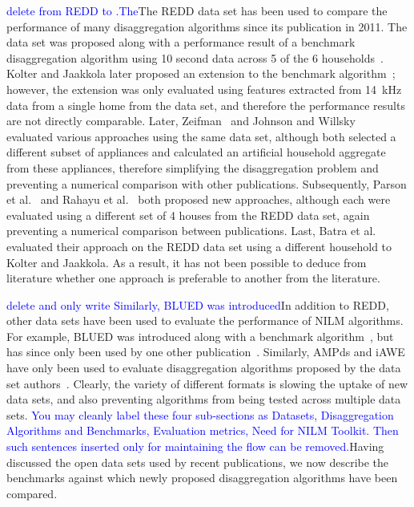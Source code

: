 \documentclass{sig-alternate}
\newcommand{\bluecolor}[1]{\textcolor{blue}{#1}}
\begin{document}
\bluecolor{delete from REDD to .The}The REDD data set has been used to compare the performance of many disaggregation algorithms since its publication in 2011. The data set was proposed along with a performance result of a benchmark disaggregation algorithm using 10 second data across 5 of the 6 households~\cite{redd}. Kolter and Jaakkola later proposed an extension to the benchmark algorithm~\cite{kolter_2012}; however, the extension was only evaluated using features extracted from 14~kHz data from a single home from the data set, and therefore the performance results are not directly comparable. Later, Zeifman~\cite{zeifman_2012} and Johnson and Willsky~\cite{johnson_2013} evaluated various approaches using the same data set, although both selected a different subset of appliances and calculated an artificial household aggregate from these appliances, therefore simplifying the disaggregation problem and preventing a numerical comparison with other publications. Subsequently, Parson et al.~\cite{parson_2012} and Rahayu et al.~\cite{rahayu_2012} both proposed new approaches, although each were evaluated using a different set of 4 houses from the REDD data set, again preventing a numerical comparison between publications. Last, Batra et al.~\cite{batra_2013} evaluated their approach on the REDD data set using a different household to Kolter and Jaakkola. As a result, it has not been possible to deduce from literature whether one approach is preferable to another from the literature.

\bluecolor{delete and only write Similarly, BLUED was introduced}In addition to REDD, other data sets have been used to evaluate the performance of NILM algorithms. For example, BLUED was introduced along with a benchmark algorithm~\cite{blued}, but has since only been used by one other publication~\cite{anderson_2012}. Similarly, AMPds and iAWE have only been used to evaluate disaggregation algorithms proposed by the data set authors~\cite{ampds,iawe}. Clearly, the variety of different formats is slowing the uptake of new data sets, and also preventing algorithms from being tested across multiple data sets. \bluecolor{You may cleanly label these four sub-sections as Datasets, Disaggregation Algorithms and Benchmarks, Evaluation metrics, Need for NILM Toolkit. Then such sentences inserted only for maintaining the flow can be removed.}Having discussed the open data sets used by recent publications, we now describe the benchmarks against which newly proposed disaggregation algorithms have been compared.
\end{document}
